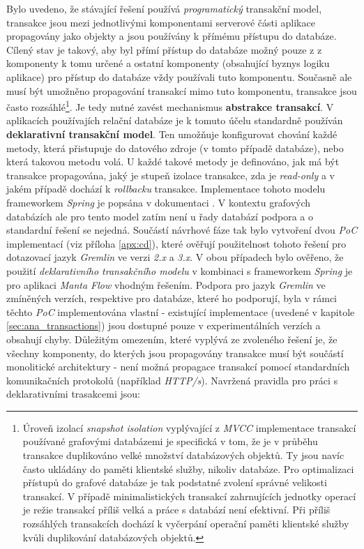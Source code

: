 Bylo uvedeno, že stávající řešení používá \textit{programatický} transakční model, transakce jsou mezi jednotlivými komponentami serverové části aplikace propagovány jako objekty a jsou používány k přímému přístupu do databáze. Cílený stav je takový, aby byl přímí přístup do databáze možný pouze z z komponenty k tomu určené a ostatní komponenty (obsahující byznys logiku aplikace) pro přístup do databáze vždy používali tuto komponentu. Současně ale musí být umožněno propagování transakcí mimo tuto komponentu, transakce jsou často rozsáhlé\footnote{Úroveň izolací \textit{snapshot isolation} vyplývající z \textit{MVCC} implementace transakcí používané grafovými databázemi je specifická v tom, že je v průběhu transakce duplikováno velké množství databázových objektů. Ty jsou navíc často ukládány do paměti klientské služby, nikoliv databáze. Pro optimalizaci přístupů do grafové databáze je tak podstatné zvolení správné velikosti transakcí. V případě minimalistických transakcí zahrnujících jednotky operací je režie transakcí příliš velká a práce s databází není efektivní. Při příliš rozsáhlých transakcích dochází k vyčerpání operační paměti klientské služby kvůli duplikování databázových objektů.}. Je tedy nutné zavést mechanismus \textbf{abstrakce transakcí}.
V aplikacích používajích relační databáze je k tomuto účelu standardně používán \textbf{deklarativní transakční model}. Ten umožňuje konfigurovat chování každé metody, která přistupuje do datového zdroje (v tomto případě databáze), nebo která takovou metodu volá. U každé takové metody je definováno, jak má být transakce propagována, jaký je stupeň izolace transakce, zda je \textit{read-only} a v jakém případě dochází k \textit{rollbacku} transakce. Implementace tohoto modelu frameworkem \textit{Spring} je popsána v dokumentaci \cite{SpringTransactions}.
V kontextu grafových databázích ale pro tento model zatím není u řady databází podpora a o standardní řešení se nejedná. Součástí návrhové fáze tak bylo vytvoření dvou \textit{PoC} implementací (viz příloha \ref{apx:cd}), které ověřují použitelnost tohoto řešení pro dotazovací jazyk \textit{Gremlin} ve verzi \textit{2.x} a \textit{3.x}. V obou případech bylo ověřeno, že použití \textit{deklarativního transakčního modelu} v kombinaci s frameworkem \textit{Spring} je pro aplikaci \textit{Manta Flow} vhodným řešením. Podpora pro jazyk \textit{Gremlin} ve zmíněných verzích, respektive pro databáze, které ho podporují, byla v rámci těchto \textit{PoC} implementována vlastní - existující implementace (uvedené v kapitole \ref{sec:ana_transactions}) jsou dostupné pouze v experimentálních verzích a obsahují chyby.
Důležitým omezením, které vyplývá ze zvoleného řešení je, že všechny komponenty, do kterých jsou propagovány transakce musí být součástí monolitické architektury - není možná propagace transakcí pomocí standardních komunikačních protokolů (například \textit{HTTP/s}). Navržená pravidla pro práci s deklarativními trasakcemi jsou:

